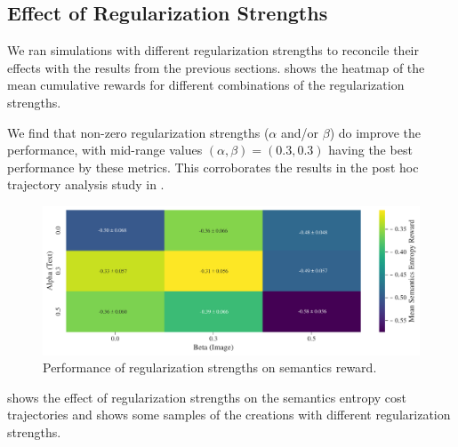 
\subsection{Effect of Regularization Strengths}
\label{sec:alpha-beta-semantics}
We ran simulations with different regularization strengths to reconcile their effects with the results from the previous sections.
 shows the heatmap of the mean cumulative rewards for different combinations of the regularization strengths.

We find that non-zero regularization strengths (\(\alpha\) and/or \(\beta\)) do improve the performance, with mid-range values \((\alpha, \beta) = (0.3, 0.
3)\) having the best performance by these metrics.
This corroborates the results in the post hoc trajectory analysis study in .

\begin{figure}[H]
    \centering
    \includegraphics[width=\textwidth]{images/alpha_beta-semantics_rair_with_std.pdf}
    \caption{Performance of regularization strengths on semantics reward.}
    \label{fig:alpha-beta-semantics}
\end{figure}

 shows the effect of regularization strengths on the semantics entropy cost trajectories and  shows some samples of the creations with different regularization strengths.

